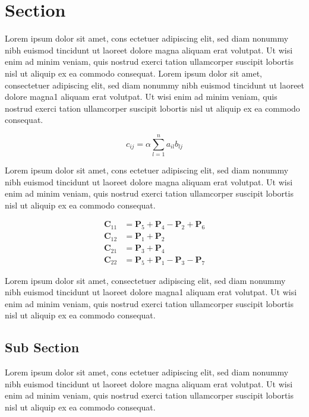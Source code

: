 \section{Section}

Lorem ipsum dolor sit amet, cons ectetuer adipiscing elit, sed diam nonummy nibh euismod tincidunt ut laoreet dolore magna aliquam erat volutpat. Ut wisi enim ad minim veniam, quis nostrud exerci tation ullamcorper suscipit lobortis nisl ut aliquip ex ea commodo consequat.
Lorem ipsum dolor sit amet, consectetuer adipiscing elit, sed diam nonummy nibh euismod tincidunt ut laoreet dolore magna1 aliquam erat volutpat. Ut wisi enim ad minim veniam, quis nostrud exerci tation ullamcorper suscipit lobortis nisl ut aliquip ex ea commodo consequat. 


\begin{equation}
    c_{ij} = \alpha\sum_{l=1}^n a_{il}b_{lj}
    \label{eq: naive matrix mult}
\end{equation}


Lorem ipsum dolor sit amet, cons ectetuer adipiscing elit, sed diam nonummy nibh euismod tincidunt ut laoreet dolore magna aliquam erat volutpat. Ut wisi enim ad minim veniam, quis nostrud exerci tation ullamcorper suscipit lobortis nisl ut aliquip ex ea commodo consequat.

\begin{align*}
    \textbf{C}_{11} &= \textbf{P}_5 + \textbf{P}_4-\textbf{P}_2+\textbf{P}_6\\
    \textbf{C}_{12} &= \textbf{P}_1 + \textbf{P}_2 \\
    \textbf{C}_{21} &= \textbf{P}_3 + \textbf{P}_4 \\
    \textbf{C}_{22} &= \textbf{P}_5 + \textbf{P}_1 - \textbf{P}_3 - \textbf{P}_7
\end{align*}

Lorem ipsum dolor sit amet, consectetuer adipiscing elit, sed diam nonummy nibh euismod tincidunt ut laoreet dolore magna1 aliquam erat volutpat. Ut wisi enim ad minim veniam, quis nostrud exerci tation ullamcorper suscipit lobortis nisl ut aliquip ex ea commodo consequat. 

\subsection{Sub Section}

Lorem ipsum dolor sit amet, cons ectetuer adipiscing elit, sed diam nonummy nibh euismod tincidunt ut laoreet dolore magna aliquam erat volutpat. Ut wisi enim ad minim veniam, quis nostrud exerci tation ullamcorper suscipit lobortis nisl ut aliquip ex ea commodo consequat.

